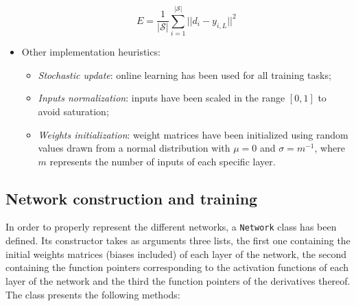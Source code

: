 \documentclass[letterpaper,headings=standardclasses]{scrartcl}
\begin{document}
\begin{itemize}
    $$ E = \frac{1}{|\mathcal{S}|} \sum_{i = 1}^{|\mathcal{S}|} || d_i - y_{i,L} ||^2 $$
    
    \item Other implementation heuristics:
    
    \begin{itemize}
        \item \emph{Stochastic update}: online learning has been used for all training tasks;
        \item \emph{Inputs normalization}: inputs have been scaled in the range $[0,1]$ to avoid saturation;
        \item \emph{Weights initialization}: weight matrices have been initialized using random values drawn from a normal distribution with $\mu = 0$ and $\sigma = m^{-1}$, where $m$ represents the number of inputs of each specific layer.
    \end{itemize}

\end{itemize}

\subsection{Network construction and training}

In order to properly represent the different networks, a \texttt{Network} class has been defined. Its constructor takes as arguments three lists, the first one containing the initial weights matrices (biases included) of each layer of the network, the second containing the function pointers corresponding to the activation functions of each layer of the network and the third the function pointers of the derivatives thereof. The class presents the following methods:
\end{document}
